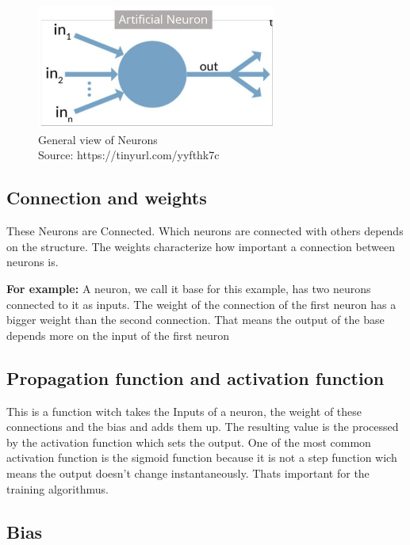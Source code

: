 \begin{figure}[h]
	\centering
	\includegraphics[width=0.7\textwidth]{./media/images/diagram-for-general-view-of-artificial-neuron.jpg}
  	\caption{General view of Neurons
  	\\Source: https://tinyurl.com/yyfthk7c}
  	\label{Gvon}
\end{figure}

\subsection{Connection and weights}

These Neurons are Connected. Which neurons are connected with others depends on the structure. The weights characterize how important a connection between neurons is. 

\textbf{For example:}\newline
A neuron, we call it base for this example, has two neurons connected to it as inputs. The weight of the connection of the first neuron has a bigger weight than the second connection. That means the output of the base depends more on the input of the first neuron 

\subsection{Propagation function  and activation function}

This is a function witch takes the Inputs of a neuron, the weight of these connections and the bias and adds them up. The resulting value is the processed by the activation function which sets the output. One of the most common activation function is the sigmoid function because it is not a step function wich means the output doesn’t change instantaneously. Thats important for the training algorithmus.

\subsection{Bias}

